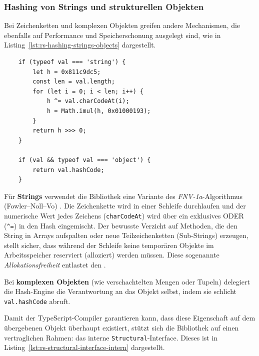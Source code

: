 
\subsubsection{Hashing von Strings und strukturellen Objekten}
\label{subsubsec:rs-intern-hash-strings-objects}

Bei Zeichenketten und komplexen Objekten greifen andere Mechanismen, die ebenfalls auf Performance und Speicherschonung ausgelegt sind, wie in Listing~\ref{lst:rs-hashing-strings-objects} dargestellt.

\begin{listing}[ht]
    \caption{Hashing von Strings und strukturellen Objekten}
    \label{lst:rs-hashing-strings-objects}
    \begin{verbatim}
    if (typeof val === 'string') {
        let h = 0x811c9dc5;
        const len = val.length;
        for (let i = 0; i < len; i++) {
            h ^= val.charCodeAt(i);
            h = Math.imul(h, 0x01000193);
        }
        return h >>> 0;
    }

    if (val && typeof val === 'object') {
        return val.hashCode;
    }
    \end{verbatim}
\end{listing}

Für \textbf{Strings} verwendet die Bibliothek eine Variante des \textit{FNV-1a}-Algorithmus (Fowler–Noll–Vo) \autocite{rfc9923}. Die Zeichenkette wird in einer Schleife durchlaufen und der numerische Wert jedes Zeichens (\texttt{charCodeAt}) wird über ein exklusives ODER (\texttt{^=}) in den Hash eingemischt. Der bewusste Verzicht auf Methoden, die den String in Arrays aufspalten oder neue Teilzeichenketten (Sub-Strings) erzeugen, stellt sicher, dass während der Schleife keine temporären Objekte im Arbeitsspeicher reserviert (alloziert) werden müssen. Diese sogenannte \textit{Allokationsfreiheit} entlastet den .

Bei \textbf{komplexen Objekten} (wie verschachtelten Mengen oder Tupeln) delegiert die Hash-Engine die Verantwortung an das Objekt selbst, indem sie schlicht \texttt{val.hashCode} abruft. 

Damit der TypeScript-Compiler garantieren kann, dass diese Eigenschaft auf dem übergebenen Objekt überhaupt existiert, stützt sich die Bibliothek auf einen vertraglichen Rahmen: das interne \texttt{Structural}-Interface. Dieses ist in Listing~\ref{lst:rs-structural-interface-intern} dargestellt.

